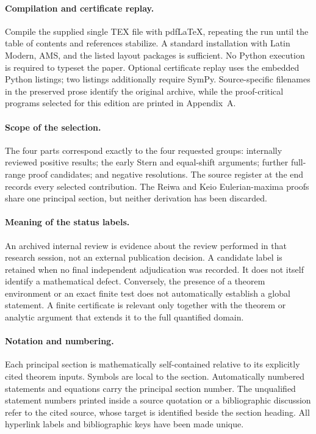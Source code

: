 \documentclass[11pt,a4paper]{article}
\begin{document}
\paragraph{Compilation and certificate replay.}
Compile the supplied single TEX file with pdfLaTeX, repeating the run
until the table of contents and references stabilize. A standard
installation with Latin Modern, AMS, and the listed layout packages is
sufficient. No Python execution is required to typeset the paper.
Optional certificate replay uses the embedded Python listings; two
listings additionally require SymPy. Source-specific filenames in the
preserved prose identify the original archive, while the proof-critical
programs selected for this edition are printed in Appendix~A.

\paragraph{Scope of the selection.}
The four parts correspond exactly to the four requested groups:
internally reviewed positive results; the early Stern and equal-shift
arguments; further full-range proof candidates; and negative resolutions.
The source register at the end records every selected contribution.
The Reiwa and Keio Eulerian-maxima proofs share one principal section,
but neither derivation has been discarded.

\paragraph{Meaning of the status labels.}
An archived internal review is evidence about the review performed in
that research session, not an external publication decision. A candidate
label is retained when no final independent adjudication was recorded.
It does not itself identify a mathematical defect. Conversely, the
presence of a theorem environment or an exact finite test does not
automatically establish a global statement. A finite certificate is
relevant only together with the theorem or analytic argument that
extends it to the full quantified domain.

\paragraph{Notation and numbering.}
Each principal section is mathematically self-contained relative to its
explicitly cited theorem inputs. Symbols are local to the section.
Automatically numbered statements and equations carry the principal
section number. The unqualified statement numbers printed inside a
source quotation or a bibliographic discussion refer to the cited
source, whose target is identified beside the section heading.
All hyperlink labels and bibliographic keys have been made unique.
\end{document}

